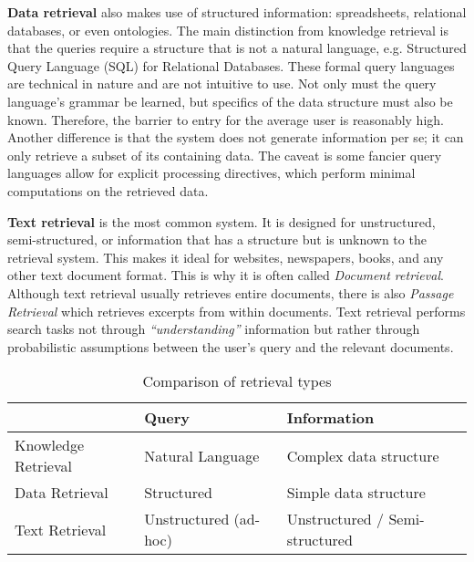 \textbf{Data retrieval} also makes use of structured information: spreadsheets, relational databases, or even ontologies. The main distinction from knowledge retrieval is that the queries require a structure that is not a natural language, e.g. Structured Query Language (SQL) for Relational Databases. These formal query languages are technical in nature and are not intuitive to use. Not only must the query language's grammar be learned, but specifics of the data structure must also be known. Therefore, the barrier to entry for the average user is reasonably high. Another difference is that the system does not generate information per se; it can only retrieve a subset of its containing data. The caveat is some fancier query languages allow for explicit processing directives, which perform minimal computations on the retrieved data.


\textbf{Text retrieval} is the most common system. It is designed for unstructured, semi-structured, or information that has a structure but is unknown to the retrieval system. This makes it ideal for websites, newspapers, books, and any other text document format. This is why it is often called \textit{Document retrieval}. Although text retrieval usually retrieves entire documents, there is also \textit{Passage Retrieval} which retrieves excerpts from within documents. Text retrieval performs search tasks not through \textit{``understanding''} information but rather through probabilistic assumptions between the user's query and the relevant documents.

\begin{table}
\begin{center}
\begin{tabular}{l|l|l|}
\cline{2-3}
                                          & Query                     & Information                    \\ \hline
\multicolumn{1}{|l|}{Knowledge Retrieval} & Natural Language          & Complex data structure         \\ \hline
\multicolumn{1}{|l|}{Data Retrieval}      & Structured                & Simple data structure          \\ \hline
\multicolumn{1}{|l|}{Text Retrieval}      & Unstructured (ad-hoc)     & Unstructured / Semi-structured \\ \hline
\end{tabular}
\end{center}
\caption{Comparison of retrieval types} \label{tab:retrievaltypes}

\end{table}

